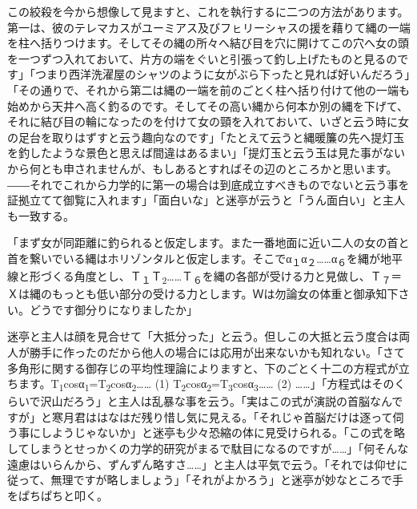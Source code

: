 \documentclass[12pt, openright]{book}
\begin{document}
この絞殺を今から想像して見ますと、これを執行するに二つの方法があります。第一は、彼のテレマカスがユーミアス及びフㇶリーシャスの援を藉りて縄の一端を柱へ括りつけます。そしてその縄の所々へ結び目を穴に開けてこの穴へ女の頭を一つずつ入れておいて、片方の端をぐいと引張って釣し上げたものと見るのです」「つまり西洋洗濯屋のシャツのように女がぶら下ったと見れば好いんだろう」「その通りで、それから第二は縄の一端を前のごとく柱へ括り付けて他の一端も始めから天井へ高く釣るのです。そしてその高い縄から何本か別の縄を下げて、それに結び目の輪になったのを付けて女の頸を入れておいて、いざと云う時に女の足台を取りはずすと云う趣向なのです」「たとえて云うと縄暖簾の先へ提灯玉を釣したような景色と思えば間違はあるまい」「提灯玉と云う玉は見た事がないから何とも申されませんが、もしあるとすればその辺のところかと思います。――それでこれから力学的に第一の場合は到底成立すべきものでないと云う事を証拠立てて御覧に入れます」「面白いな」と迷亭が云うと「うん面白い」と主人も一致する。

「まず女が同距離に釣られると仮定します。また一番地面に近い二人の女の首と首を繋いでいる縄はホリゾンタルと仮定します。そこでα\textsubscript{１}α\textsubscript{２}\ldots{}\ldots{}α\textsubscript{６}を縄が地平線と形づくる角度とし、Ｔ\textsubscript{１}Ｔ\textsubscript{2}\ldots{}\ldots{}Ｔ\textsubscript{６}を縄の各部が受ける力と見做し、Ｔ\textsubscript{７}＝Ｘは縄のもっとも低い部分の受ける力とします。Ｗは勿論女の体重と御承知下さい。どうです御分りになりましたか」

迷亭と主人は顔を見合せて「大抵分った」と云う。但しこの大抵と云う度合は両人が勝手に作ったのだから他人の場合には応用が出来ないかも知れない。「さて多角形に関する御存じの平均性理論によりますと、下のごとく十二の方程式が立ちます。T\textsubscript{1}cosα\textsubscript{1}=T\textsubscript{2}cosα\textsubscript{2}\ldots{}\ldots{} (1) T\textsubscript{2}cosα\textsubscript{2}=T\textsubscript{3}cosα\textsubscript{3}\ldots{}\ldots{} (2) \ldots{}\ldots{}」「方程式はそのくらいで沢山だろう」と主人は乱暴な事を云う。「実はこの式が演説の首脳なんですが」と寒月君ははなはだ残り惜し気に見える。「それじゃ首脳だけは逐って伺う事にしようじゃないか」と迷亭も少々恐縮の体に見受けられる。「この式を略してしまうとせっかくの力学的研究がまるで駄目になるのですが\ldots{}\ldots{}」「何そんな遠慮はいらんから、ずんずん略すさ\ldots{}\ldots{}」と主人は平気で云う。「それでは仰せに従って、無理ですが略しましょう」「それがよかろう」と迷亭が妙なところで手をぱちぱちと叩く。
\end{document}
